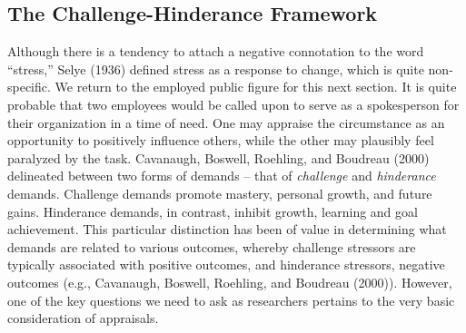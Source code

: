 \documentclass[
  english,
  man]{apa6}
\begin{document}
\hypertarget{the-challenge-hinderance-framework}{%
\subsection{The Challenge-Hinderance Framework}\label{the-challenge-hinderance-framework}}

Although there is a tendency to attach a negative connotation to the word ``stress,'' Selye (1936) defined stress as a response to change, which is quite non-specific. We return to the employed public figure for this next section. It is quite probable that two employees would be called upon to serve as a spokesperson for their organization in a time of need. One may appraise the circumstance as an opportunity to positively influence others, while the other may plausibly feel paralyzed by the task. Cavanaugh, Boswell, Roehling, and Boudreau (2000) delineated between two forms of demands -- that of \emph{challenge} and \emph{hinderance} demands. Challenge demands promote mastery, personal growth, and future gains. Hinderance demands, in contrast, inhibit growth, learning and goal achievement. This particular distinction has been of value in determining what demands are related to various outcomes, whereby challenge stressors are typically associated with positive outcomes, and hinderance stressors, negative outcomes (e.g., Cavanaugh, Boswell, Roehling, and Boudreau (2000)). However, one of the key questions we need to ask as researchers pertains to the very basic consideration of appraisals.
\end{document}
